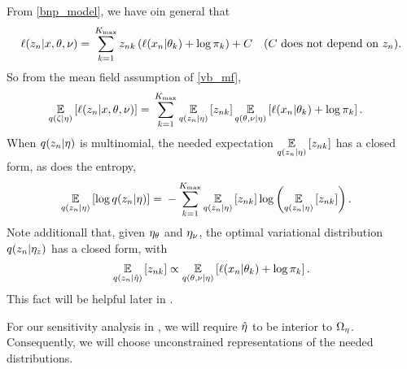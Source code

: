 


\begin{ex}
%
From \eqref{bnp_model}, we have oin general that
%
\begin{align*}
%
\logp(\z_n \vert \x, \theta, \nu) ={}&
\sum_{k=1}^{\kmax}
    \z_{\n\k} \left(
        \logp(\x_n \vert \theta_\k) + \log \pi_\k
    \right) + \const & \constdesc{\z_\n}.
%
\end{align*}
%
So from the mean field assumption of \eqref{vb_mf},
%
\begin{align*}
%
\expect{\q(\zeta \vert \eta)}{\logp(\z_n \vert \x, \theta, \nu)} ={}&
\sum_{k=1}^{\kmax}
    \expect{\q(\z_\n \vert \eta)}{\z_{\n\k}}
    \expect{\q(\theta, \nu \vert \eta)}
           {\logp(\x_n \vert \theta_\k) + \log \pi_\k}.
%
\end{align*}
%
When $q(z_n \vert \eta)$ is multinomial, the needed expectation
$\underset{q(z_n \vert \eta)}{\mathbb{E}}\left[z_{nk}\right]$ has a closed form, as does the
entropy,
%
\begin{align*}
%
\expect{\q(\z_\n \vert \eta)}{\log \q(\z_\n \vert \eta)} ={}&
    - \sum_{\k=1}^{\kmax}
        \expect{\q(\z_\n \vert \eta)}{\z_{\n\k}}
        \log \left( \expect{\q(\z_\n \vert \eta)}{\z_{\n\k}} \right).
%
\end{align*}
%
Note additionall that, given $\eta_{\theta}$ and $\eta_{\nu}$, the optimal
variational distribution $q(z_n \vert \eta_{z})$ has a closed form, with
%
\begin{align*}
%
\expect{\q(\z_\n \vert \etaopt)}{\z_{\n\k}} \propto
    \expect{\q(\theta, \nu \vert \eta)}
           {\logp(\x_n \vert \theta_\k) + \log \pi_\k}.
%
\end{align*}
%
This fact will be helpful later in .
%
\end{ex}



For our sensitivity analysis in , we will require
$\hat\eta$ to be interior to $\Omega_{\eta}$.  Consequently, we will choose
unconstrained representations of the needed distributions.


